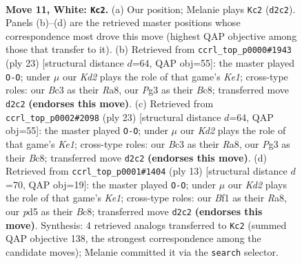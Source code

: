 \documentclass[11pt]{article}
\begin{document}
\clearpage

\begin{figure}[p]\centering
\begin{subfigure}{0.46\textwidth}\centering
\resizebox{\linewidth}{!}{%
\newchessgame
\chessboard[
  setfen={r1b1k2r/p1p1qpp1/2n2n2/1p1p3p/3P4/2B2NPP/PP1KPP2/R2Q1B1R w kq - 0 11},
  showmover=false,
  pgfstyle=straightmove, color=movearrow, markmove={d2-c2}
]}
\caption{}
\end{subfigure}\hfill
\begin{subfigure}{0.46\textwidth}\centering
\resizebox{\linewidth}{!}{%
\newchessgame
\chessboard[
  setfen={r1bqk2r/2p1npb1/p5pp/1p1pP3/3P4/2N2N2/PPB2PPP/R2QK2R b KQkq - 0 12},
  showmover=false,
  pgfstyle=straightmove, color=movearrow, markmove={e8-g8}
]}
\caption{}
\end{subfigure}
\\[4pt]
\begin{subfigure}{0.46\textwidth}\centering
\resizebox{\linewidth}{!}{%
\newchessgame
\chessboard[
  setfen={r1bqk2r/2p1npb1/p5pp/1p1pP3/3P4/2N2N2/PPB2PPP/R2QK2R b KQkq - 0 12},
  showmover=false,
  pgfstyle=straightmove, color=movearrow, markmove={e8-g8}
]}
\caption{}
\end{subfigure}\hfill
\begin{subfigure}{0.46\textwidth}\centering
\resizebox{\linewidth}{!}{%
\newchessgame
\chessboard[
  setfen={r1bqk2r/pppn1ppp/2pb4/4p3/3PP3/2N2N1P/PPP2PP1/R1BQK2R b KQkq - 0 7},
  showmover=false,
  pgfstyle=straightmove, color=movearrow, markmove={e8-g8}
]}
\caption{}
\end{subfigure}
\caption{\textbf{Move 11, White: \texttt{Kc2}.} (a) Our position; Melanie plays \texttt{Kc2} (\texttt{d2c2}). Panels (b)--(d) are the retrieved master positions whose correspondence most drove this move (highest QAP objective among those that transfer to it). (b) Retrieved from \texttt{ccrl\_top\_p0000\#1943} (ply 23) [structural distance $d$=64, QAP obj=55]: the master played \texttt{O-O}; under $\mu$ our \emph{Kd2} plays the role of that game's \emph{Ke1}; cross-type roles: our \emph{B}c3 as their \emph{R}a8, our \emph{P}g3 as their \emph{B}c8; transferred move \texttt{d2c2} \textbf{(endorses this move)}. (c) Retrieved from \texttt{ccrl\_top\_p0002\#2098} (ply 23) [structural distance $d$=64, QAP obj=55]: the master played \texttt{O-O}; under $\mu$ our \emph{Kd2} plays the role of that game's \emph{Ke1}; cross-type roles: our \emph{B}c3 as their \emph{R}a8, our \emph{P}g3 as their \emph{B}c8; transferred move \texttt{d2c2} \textbf{(endorses this move)}. (d) Retrieved from \texttt{ccrl\_top\_p0001\#1404} (ply 13) [structural distance $d$=70, QAP obj=19]: the master played \texttt{O-O}; under $\mu$ our \emph{Kd2} plays the role of that game's \emph{Ke1}; cross-type roles: our \emph{B}f1 as their \emph{R}a8, our \emph{p}d5 as their \emph{B}c8; transferred move \texttt{d2c2} \textbf{(endorses this move)}. Synthesis: 4 retrieved analogs transferred to \texttt{Kc2} (summed QAP objective 138, the strongest correspondence among the candidate moves); Melanie committed it via the \texttt{search} selector.}
\label{fig:thought-m20}
\end{figure}
\end{document}
